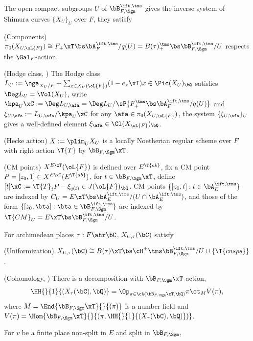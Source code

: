 \documentclass[article, a4paper, twoside]{universal}
\begin{document}
\begin{stp}
    The open compact subgroups $U$ of $\bB_{F,\Sgm}^{\ift,\tms}$ gives the inverse system of Shimura curves $\{X_{U}\}_{U}$ over $F$, they satisfy
    \begin{itm}
        \item (Components) $\pi_{0}(X_{U,\oL{F}})\cong F_{+}\xT\bs\bA_{F}^{\ift,\tms}/q(U)=B(\tau)_{+}^{\tms}\bs\bB_{F,\Sgm}^{\ift,\tms}/U$ respects the $\Gal_{F}$-action.
        \item (Hodge class, \cite[Lemma~3.1]{YZZ2013}) The Hodge class $L_{U}:=\oga_{X_{U}/F}+\sum_{x\in X_{U}(\oL{F})}(1-e_{x}\xI)x\in\Pic(X_{U})_{\bQ}$ satisfies $\Deg L_{U}=\Vol(X_{U})$, write $\kpa_{U}\xC:=\Deg L_{U,\afa}=\Deg L_{U}/\sP{F_{+}^{\tms}\bs\bA_{F}^{\ift,\tms}/q(U)}$ and $\xi_{U,\afa}:=L_{U,\afa}/\kpa_{U}\xC$ for any $\afa\in\pi_{0}(X_{U,\oL{F}})$, the system $\{\xi_{U,\afa}\}_{U}$ gives a well-defined element $\xi_{\afa}\in\Cl(X_{\oL{F}})_{\bQ}$.
        \item (Hecke action) $X:=\plim_{U}X_{U}$ is a locally Noetherian regular scheme over $F$ with right action $\T{T}$ by $\bB_{F,\Sgm}\xT$.
        \item (CM points) $X^{E\xT}(\oL{F})$ is defined over $E^{\T{ab}}$, fix a CM point $P=[z_{0},1]\in X^{E\xT}(E^{\T{ab}})$, for $t\in\bB_{F,\Sgm}\xT$, define $[t]\xC:=\T{T}_{t}P-\xi_{q(t)}\in J(\oL{F})_{\bQ}$. CM points $\{[z_{0},t]:t\in\bA_{E}^{\ift,\tms}\}$ are indexed by $C_{U}=E\xT\bs\bA_{E}^{\ift,\tms}/(U\cap\bA_{E}^{\ift,\tms})$, and those of the form $\{[z_{0},\bta]: \bta\in\bB_{F,\Sgm}^{\ift,\tms}\}$ are indexed by $\T{CM}_{U}=E\xT\bs\bB_{F,\Sgm}^{\ift,\tms}/U$.
    \end{itm}
    For archimedean places $\tau:F\ahr\bC$, $X_{U,\tau}(\bC)$ satisfy
    \begin{itm}
        \item (Uniformization) $X_{U,\tau}(\bC)\cong B(\tau)\xT\bs\cH^{\pm}\tms\bB_{F,\Sgm}^{\ift,\tms}/U\cup\{\T{cusps}\}$.
        \item (Cohomology, \cite[Theorem~3.7]{YZZ2013}) There is a decomposition with $\bB_{F,\Sgm}\xT$-action,
        \[
            \HH{}{1}{(X_{\tau}(\bC),\bQ)}=\Op_{\pi\in\cA(\bB_{F,\Sgm}\xT,\bQ)}\pi\ot_{M}V(\pi),
        \]
        where $M=\End{\bB_{F,\Sgm}\xT}{}{(\pi)}$ is a number field and  $V(\pi)=\Hom{\bB_{F,\Sgm}\xT}{}{(\pi,\HH{}{1}{(X_{\tau}(\bC),\bQ)})}$.
    \end{itm}
    For $v$ be a finite place non-split in $E$ and split in $\bB_{F,\Sgm}$,
    \begin{itm}

\end{itm}
\end{stp}
\end{document}
